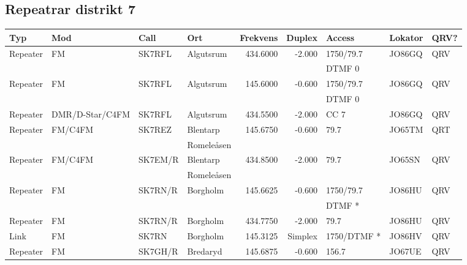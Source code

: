 \subsection{Repeatrar distrikt 7}
\scriptsize
\begin{longtable}{llllrrlll}
\bf Typ  & \bf Mod         & \bf Call & \bf Ort      & \bf Frekvens & \bf Duplex & \bf Access   & \bf Lokator & \bf QRV? \\ \hline
Repeater & FM              & SK7RFL   & Algutsrum    & 434.6000     & -2.000     & 1750/79.7    & JO86GQ      & QRV      \\
         &                 &          &              &              &            & DTMF 0       &             &          \\
Repeater & FM              & SK7RFL   & Algutsrum    & 145.6000     & -0.600     & 1750/79.7    & JO86GQ      & QRV      \\
         &                 &          &              &              &            & DTMF 0       &             &          \\
Repeater & DMR/D-Star/C4FM & SK7RFL   & Algutsrum    & 434.5500     & -2.000     & CC 7         & JO86GQ      & QRV      \\
Repeater & FM/C4FM         & SK7REZ   & Blentarp     & 145.6750     & -0.600     & 79.7         & JO65TM      & QRT      \\
         &                 &          & Romeleåsen   &              &            &              &             &          \\
Repeater & FM/C4FM         & SK7EM/R  & Blentarp     & 434.8500     & -2.000     & 79.7         & JO65SN      & QRV      \\
         &                 &          & Romeleåsen   &              &            &              &             &          \\
Repeater & FM              & SK7RN/R  & Borgholm     & 145.6625     & -0.600     & 1750/79.7    & JO86HU      & QRV      \\
         &                 &          &              &              &            & DTMF *       &             &          \\
Repeater & FM              & SK7RN/R  & Borgholm     & 434.7750     & -2.000     & 79.7         & JO86HU      & QRV      \\
Link     & FM              & SK7RN    & Borgholm     & 145.3125     & Simplex    & 1750/DTMF *  & JO86HV      & QRV      \\
Repeater & FM              & SK7GH/R  & Bredaryd     & 145.6875     & -0.600     & 156.7        & JO67UE      & QRV      \\

\end{longtable}
